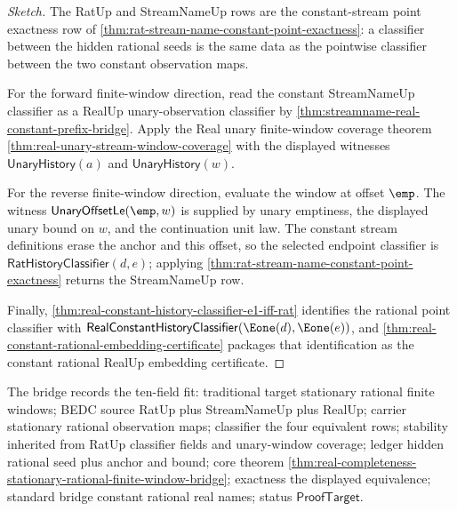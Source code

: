 \begin{proof}[Sketch]
The RatUp and StreamNameUp rows are the constant-stream point exactness row of
\autoref{thm:rat-stream-name-constant-point-exactness}: a classifier between
the hidden rational seeds is the same data as the pointwise classifier between
the two constant observation maps.

For the forward finite-window direction, read the constant StreamNameUp
classifier as a RealUp unary-observation classifier by
\autoref{thm:streamname-real-constant-prefix-bridge}. Apply the Real unary
finite-window coverage theorem \autoref{thm:real-unary-stream-window-coverage}
with the displayed witnesses $\mathsf{UnaryHistory}(a)$ and
$\mathsf{UnaryHistory}(w)$.

For the reverse finite-window direction, evaluate the window at offset $\emp$.
The witness $\mathsf{UnaryOffsetLe}(\emp,w)$ is supplied by unary emptiness, the
displayed unary bound on $w$, and the continuation unit law. The constant
stream definitions erase the anchor and this offset, so the selected endpoint
classifier is $\mathsf{RatHistoryClassifier}(d,e)$; applying
\autoref{thm:rat-stream-name-constant-point-exactness} returns the
StreamNameUp row.

Finally, \autoref{thm:real-constant-history-classifier-e1-iff-rat} identifies
the rational point classifier with
$\mathsf{RealConstantHistoryClassifier}(\Eone(d),\Eone(e))$, and
\autoref{thm:real-constant-rational-embedding-certificate} packages that
identification as the constant rational RealUp embedding certificate.
\end{proof}

The bridge records the ten-field fit: traditional target stationary rational
finite windows; BEDC source RatUp plus StreamNameUp plus RealUp; carrier
stationary rational observation maps; classifier the four equivalent rows;
stability inherited from RatUp classifier fields and unary-window coverage;
ledger hidden rational seed plus anchor and bound; core theorem
\autoref{thm:real-completeness-stationary-rational-finite-window-bridge};
exactness the displayed equivalence; standard bridge constant rational real
names; status $\mathsf{ProofTarget}$.


